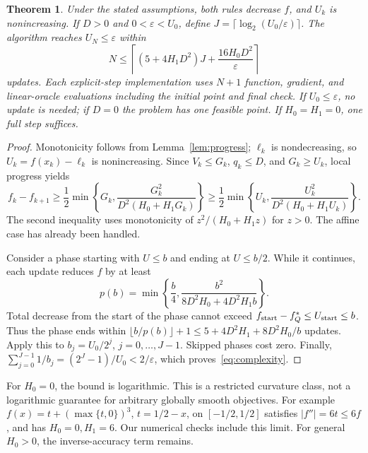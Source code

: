 \documentclass[11pt]{article}
\newtheorem{theorem}{Theorem}
\begin{document}
\begin{theorem}\label{thm:main}
Under the stated assumptions, both rules decrease $f$, and $U_k$ is
nonincreasing. If $D>0$ and $0<\varepsilon<U_0$, define
$J=\lceil\log_2(U_0/\varepsilon)\rceil$. The algorithm reaches
$U_N\le\varepsilon$ within
\begin{equation}\label{eq:complexity}
 N\le\left\lceil(5+4H_1D^2)J+\frac{16H_0D^2}{\varepsilon}\right\rceil
\end{equation}
updates. Each explicit-step implementation uses $N+1$ function, gradient,
and linear-oracle evaluations including the initial point and final check.
If $U_0\le\varepsilon$, no update is needed; if $D=0$ the problem has one
feasible point. If $H_0=H_1=0$, one full step suffices.
\end{theorem}
\begin{proof}
Monotonicity follows from Lemma~\ref{lem:progress}; $\ell_k$ is nondecreasing,
so $U_k=f(x_k)-\ell_k$ is nonincreasing. Since $V_k\le G_k$, $q_k\le D$,
and $G_k\ge U_k$, local progress yields
\begin{equation}\label{eq:certificateprogress}
 f_k-f_{k+1}\ge\frac12\min\left\{G_k,
 \frac{G_k^2}{D^2(H_0+H_1G_k)}\right\}
 \ge\frac12\min\left\{U_k,
 \frac{U_k^2}{D^2(H_0+H_1U_k)}\right\}.
\end{equation}
The second inequality uses monotonicity of $z^2/(H_0+H_1z)$ for $z>0$.
The affine case has already been handled.

Consider a phase starting with $U\le b$ and ending at $U\le b/2$.
While it continues, each update reduces $f$ by at least
\[
 p(b)=\min\left\{\frac b4,
       \frac{b^2}{8D^2H_0+4D^2H_1b}\right\}.
\]
Total decrease from the start of the phase cannot exceed
$f_{\rm start}-f_Q^*\le U_{\rm start}\le b$. Thus the phase ends within
$\lfloor b/p(b)\rfloor+1\le5+4D^2H_1+8D^2H_0/b$ updates.
Apply this to $b_j=U_0/2^j$, $j=0,\ldots,J-1$. Skipped phases cost zero.
Finally,
$\sum_{j=0}^{J-1}1/b_j=(2^J-1)/U_0<2/\varepsilon$,
which proves~\eqref{eq:complexity}.
\end{proof}

For $H_0=0$, the bound is logarithmic. This is a restricted curvature
class, not a logarithmic guarantee for arbitrary globally smooth objectives.
For example $f(x)=t+(\max\{t,0\})^3$, $t=1/2-x$, on $[-1/2,1/2]$ satisfies
$|f''|=6t\le6f$, and has $H_0=0,H_1=6$. Our numerical checks include
this limit. For general $H_0>0$, the inverse-accuracy term remains.




\end{document}
